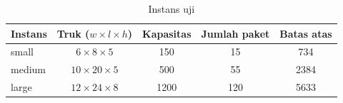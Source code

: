 \begin{table}[H]
	\centering
	\caption{Instans uji}
	\label{tab:instans}
	\begin{tabular}{l c c c c}
		\toprule
		\textbf{Instans} & \textbf{Truk} ($w\times l\times h$) & \textbf{Kapasitas} & \textbf{Jumlah paket} & \textbf{Batas atas} \\
		\midrule
		small  & $6\times8\times5$    & 150  & 15  & 734 \\
		medium & $10\times20\times5$  & 500  & 55  & 2384 \\
		large  & $12\times24\times8$  & 1200 & 120 & 5633 \\
		\bottomrule
	\end{tabular}
\end{table}
